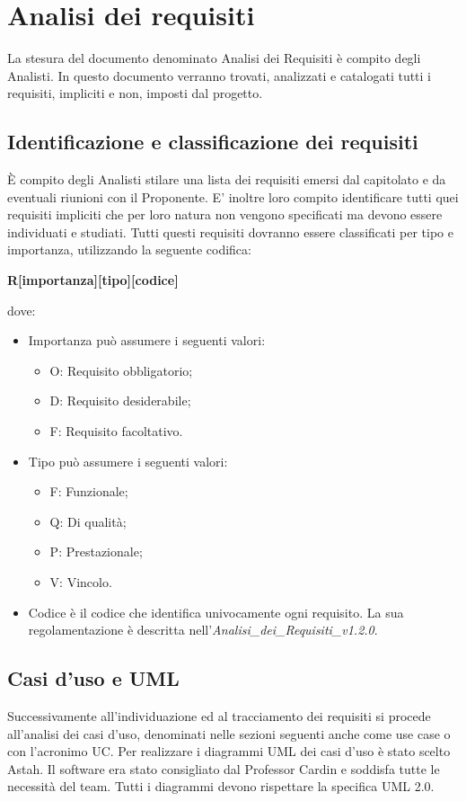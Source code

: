 \newpage
\section{Analisi dei requisiti}
\label{7.0}
La stesura del documento denominato Analisi dei Requisiti è compito degli Analisti. 
In questo documento verranno trovati, analizzati e catalogati tutti i requisiti, impliciti e non, imposti dal progetto.

\subsection{Identificazione e classificazione dei requisiti}
\label{7.1}
È compito degli Analisti stilare una lista dei requisiti emersi dal capitolato e da eventuali riunioni con il Proponente. E' inoltre loro compito identificare tutti quei requisiti impliciti che per loro natura non vengono specificati ma devono essere individuati e studiati. Tutti questi requisiti dovranno essere classificati per tipo e importanza, utilizzando la seguente codifica:
\begin{center}
\textbf{R[importanza][tipo][codice]}
\end{center}
dove:
\begin{itemize}
\item Importanza può assumere i seguenti valori:
	\begin{itemize}
	\item O: Requisito obbligatorio;
	\item D: Requisito desiderabile;
	\item F: Requisito facoltativo.
	\end{itemize}
\item Tipo può assumere i seguenti valori:
	\begin{itemize}
	\item F: Funzionale;
	\item Q: Di qualità;
	\item P: Prestazionale;
	\item V: Vincolo.
	\end{itemize}
\item Codice è il codice che identifica univocamente ogni requisito. La sua regolamentazione è descritta nell'\emph{Analisi_dei_Requisiti_v1.2.0}.
\end{itemize}

\subsection{Casi d’uso e UML}
\label{7.2}
Successivamente all'individuazione ed al tracciamento dei requisiti si procede all'analisi dei casi d'uso, denominati nelle sezioni seguenti anche come use case o con l'acronimo UC.
Per realizzare i diagrammi UML dei casi d'uso è stato scelto Astah. Il software era stato consigliato dal Professor Cardin e soddisfa tutte le necessità del team.
Tutti i diagrammi devono rispettare la specifica UML 2.0.

